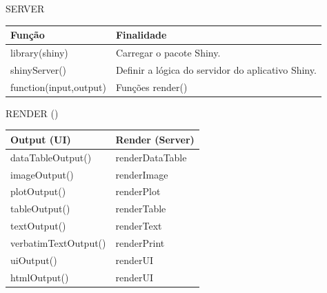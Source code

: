 \documentclass[
  ignorenonframetext,
]{beamer}
\begin{document}
\begin{frame}{SERVER}
\protect\hypertarget{server}{}

\begin{table}
\begin{tabular}{l | l}
Função & Finalidade \\
\hline \hline
library(shiny) & \small Carregar o pacote Shiny. \\
shinyServer() & \small Definir a lógica do servidor do aplicativo Shiny. \\ 
function(input,output){} & \small Funções render() \\
\end{tabular}
\end{table}

\end{frame}

\begin{frame}{RENDER ()}
\protect\hypertarget{render}{}

\begin{table}
\begin{tabular}{l | l}
Output (UI) & Render (Server) \\
\hline \hline
dataTableOutput() &  renderDataTable \\
imageOutput() & renderImage \\
plotOutput() & renderPlot \\
tableOutput() & renderTable \\
textOutput() & renderText \\
verbatimTextOutput() & renderPrint \\
uiOutput() & renderUI\\
htmlOutput() & renderUI \\ 
\end{tabular}
\end{table}

\end{frame}
\end{document}
